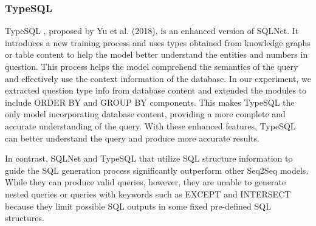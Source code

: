 \subsubsection{TypeSQL}
TypeSQL \cite{DBLP:journals/corr/abs-1804-09769}, proposed by Yu et al. (2018), is an enhanced version of SQLNet. It introduces a new training process and uses types obtained from knowledge graphs or table content to help the model better understand the entities and numbers in question. This process helps the model comprehend the semantics of the query and effectively use the context information of the database. In our experiment, we extracted question type info from database content and extended the modules to include ORDER BY and GROUP BY components. This makes TypeSQL the only model incorporating database content, providing a more complete and accurate understanding of the query. With these enhanced features, TypeSQL can better understand the query and produce more accurate results.

In contrast, SQLNet and TypeSQL that utilize SQL structure information to guide the SQL generation process significantly outperform other Seq2Seq models. While they can produce valid queries, however, they are unable to generate nested queries or queries with keywords such as EXCEPT and INTERSECT because they limit possible SQL outputs in some fixed pre-defined SQL structures.